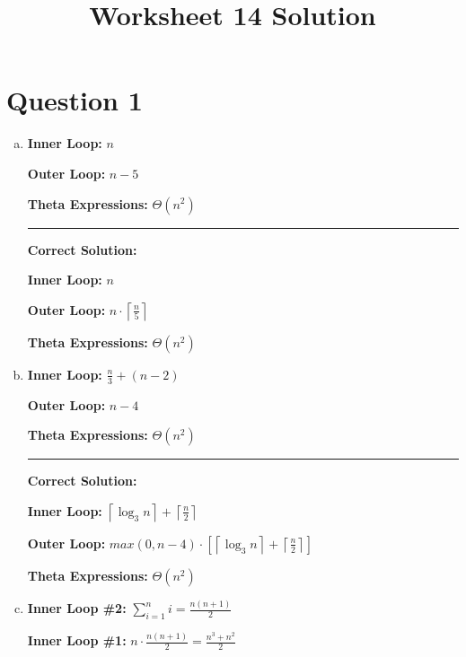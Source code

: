 \documentclass[12pt]{article}
\begin{document}
\title{Worksheet 14 Solution}
\maketitle

\section*{Question 1}
\begin{enumerate}[a.]
    \item

    \textbf{Inner Loop:} $n$

    \textbf{Outer Loop:} $n - 5$

    \textbf{Theta Expressions:} $\Theta (n^2)$

    \noindent\rule{\textwidth}{1pt}

    \textbf{Correct Solution:}

    \bigskip

    \textbf{Inner Loop:} $n$

    \textbf{Outer Loop:} $n \cdot \left\lceil \displaystyle\frac{n}{5} \right\rceil$

    \textbf{Theta Expressions:} $\Theta (n^2)$

    \item

    \textbf{Inner Loop:} $\displaystyle \frac{n}{3} + (n - 2)$

    \textbf{Outer Loop:} $n - 4$

    \textbf{Theta Expressions:} $\Theta (n^2)$

    \noindent\rule{\textwidth}{1pt}

    \textbf{Correct Solution:}

    \bigskip

    \textbf{Inner Loop:} $\left\lceil \log_3 n \right\rceil + \left\lceil \displaystyle\frac{n}{2} \right\rceil$

    \textbf{Outer Loop:} $max(0, n-4) \cdot \left[ \left\lceil \log_3 n \right\rceil + \left\lceil \displaystyle\frac{n}{2} \right\rceil \right]$

    \textbf{Theta Expressions:} $\Theta (n^2)$

    \item

    \textbf{Inner Loop \#2:} $\sum\limits_{i=1}^n i = \displaystyle\frac{n(n+1)}{2}$

    \textbf{Inner Loop \#1:} $n \cdot \displaystyle\frac{n(n+1)}{2} = \displaystyle\frac{n^3 + n^2}{2}$


\end{enumerate}
\end{document}
